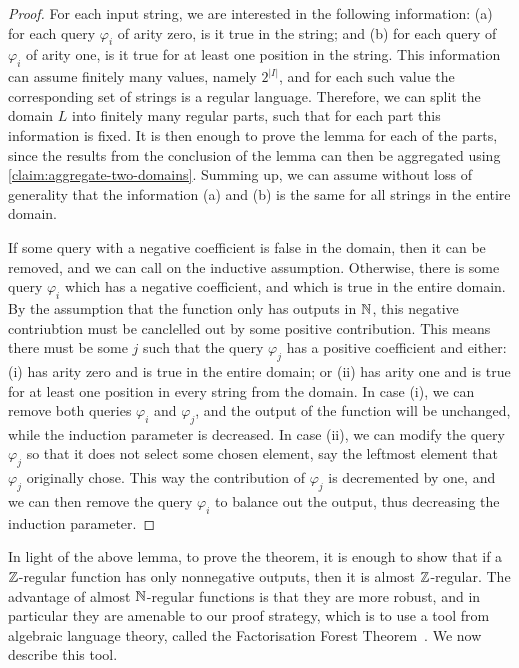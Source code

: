 \begin{proof}
        For each input string, we are interested in the following information: (a) for each query $\varphi_i$ of arity zero, is it true in the string; and (b) for each query of $\varphi_i$ of arity one, is it true for at least one position in the string. This information can assume finitely many values, namely $2^{|I|}$, and for each such value the corresponding set of strings is a regular language. Therefore, we can split the domain $L$ into finitely many regular parts, such that for each part this information is fixed. It is then enough to prove the lemma for each of the parts, since the results from the conclusion of the lemma can then be aggregated using  \cref{claim:aggregate-two-domains}. Summing up, we  can assume without loss of generality that the information (a) and (b) is the same for all strings in the entire domain. 
        
        If some query with a negative coefficient is false in the domain, then it can be removed, and we can call on the inductive assumption. Otherwise, there is some query $\varphi_i$ which has a negative coefficient, and which is true in the entire domain. By the assumption that the function only has outputs in ${\mathbb N}$, this negative contriubtion must be canclelled out by some positive contribution. This means  there must be some $j$ such that the query $\varphi_j$ has a positive coefficient and either: (i) has arity zero and is true in the entire domain; or (ii) has arity one and is true for at least one position in every string from the domain. In case (i), we can remove both queries $\varphi_i$ and $\varphi_j$, and the output of the function will be unchanged, while the induction parameter is decreased. In case (ii), we can modify the query $\varphi_j$ so that it does not select some chosen element, say the leftmost element that $\varphi_j$ originally chose. This way the contribution of $\varphi_j$ is decremented by one, and we can then remove the query $\varphi_i$ to balance out the output, thus decreasing the induction parameter.
    \end{proof}


    In light of the above lemma, to prove the theorem, it is enough to show that if a ${\mathbb Z}$-regular function has only nonnegative outputs, then it is almost ${\mathbb Z}$-regular. The advantage of almost ${\mathbb N}$-regular functions is that they are more robust, and in particular they are amenable to our proof strategy, which is to use a tool from algebraic language theory, called the Factorisation Forest Theorem~\cite[Theorem 6.1]{simonFactorizationForestsFinite1990}. We now describe this tool.

